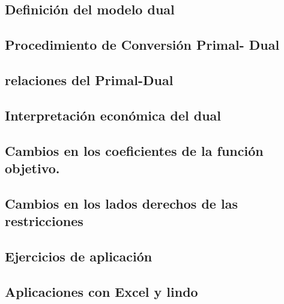 \documentclass[
  letterpaper,
  DIV=11,
  numbers=noendperiod]{scrreprt}
\theoremstyle{definition}
\theoremstyle{definition}
\theoremstyle{remark}
\begin{document}
\hypertarget{definiciuxf3n-del-modelo-dual}{%
\subsection{Definición del modelo
dual}\label{definiciuxf3n-del-modelo-dual}}

\hypertarget{procedimiento-de-conversiuxf3n-primal--dual}{%
\subsection{Procedimiento de Conversión Primal-
Dual}\label{procedimiento-de-conversiuxf3n-primal--dual}}

\hypertarget{relaciones-del-primal-dual}{%
\subsection{relaciones del
Primal-Dual}\label{relaciones-del-primal-dual}}

\hypertarget{interpretaciuxf3n-econuxf3mica-del-dual}{%
\subsection{Interpretación económica del
dual}\label{interpretaciuxf3n-econuxf3mica-del-dual}}

\hypertarget{cambios-en-los-coeficientes-de-la-funciuxf3n-objetivo.}{%
\subsection{Cambios en los coeficientes de la función
objetivo.}\label{cambios-en-los-coeficientes-de-la-funciuxf3n-objetivo.}}

\hypertarget{cambios-en-los-lados-derechos-de-las-restricciones}{%
\subsection{Cambios en los lados derechos de las
restricciones}\label{cambios-en-los-lados-derechos-de-las-restricciones}}

\hypertarget{ejercicios-de-aplicaciuxf3n-1}{%
\subsection{Ejercicios de
aplicación}\label{ejercicios-de-aplicaciuxf3n-1}}

\hypertarget{aplicaciones-con-excel-y-lindo-1}{%
\subsection{Aplicaciones con Excel y
lindo}\label{aplicaciones-con-excel-y-lindo-1}}
\end{document}
